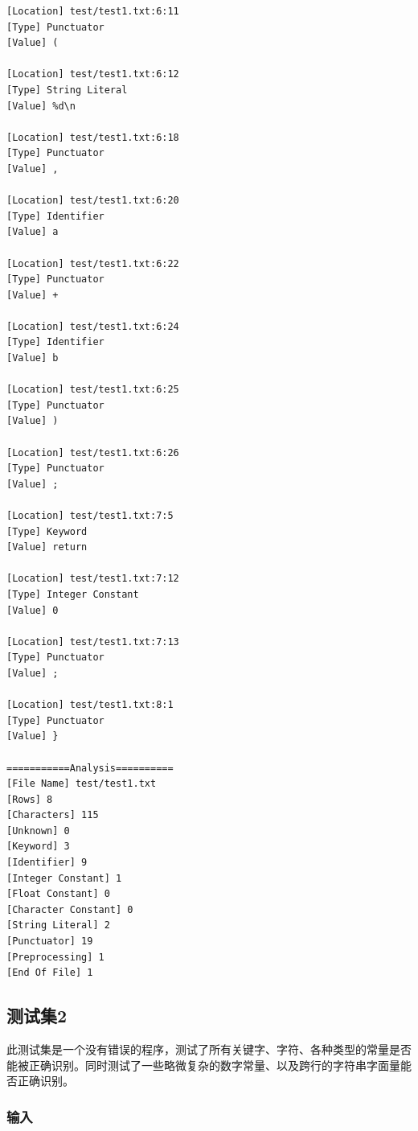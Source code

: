\documentclass[lang=cn,11pt,a4paper,cite=authornum]{paper}
\begin{document}
\begin{code}
\begin{verbatim}
[Location] test/test1.txt:6:11
[Type] Punctuator
[Value] (

[Location] test/test1.txt:6:12
[Type] String Literal
[Value] %d\n

[Location] test/test1.txt:6:18
[Type] Punctuator
[Value] ,

[Location] test/test1.txt:6:20
[Type] Identifier
[Value] a

[Location] test/test1.txt:6:22
[Type] Punctuator
[Value] +

[Location] test/test1.txt:6:24
[Type] Identifier
[Value] b

[Location] test/test1.txt:6:25
[Type] Punctuator
[Value] )

[Location] test/test1.txt:6:26
[Type] Punctuator
[Value] ;

[Location] test/test1.txt:7:5
[Type] Keyword
[Value] return

[Location] test/test1.txt:7:12
[Type] Integer Constant
[Value] 0

[Location] test/test1.txt:7:13
[Type] Punctuator
[Value] ;

[Location] test/test1.txt:8:1
[Type] Punctuator
[Value] }

===========Analysis==========
[File Name] test/test1.txt
[Rows] 8
[Characters] 115
[Unknown] 0
[Keyword] 3
[Identifier] 9
[Integer Constant] 1
[Float Constant] 0
[Character Constant] 0
[String Literal] 2
[Punctuator] 19
[Preprocessing] 1
[End Of File] 1
\end{verbatim}
\end{code}

\subsection{测试集2}

此测试集是一个没有错误的程序，测试了所有关键字、字符、各种类型的常量是否能被正确识别。同时测试了一些略微复杂的数字常量、以及跨行的字符串字面量能否正确识别。

\subsubsection{输入}
\end{document}
